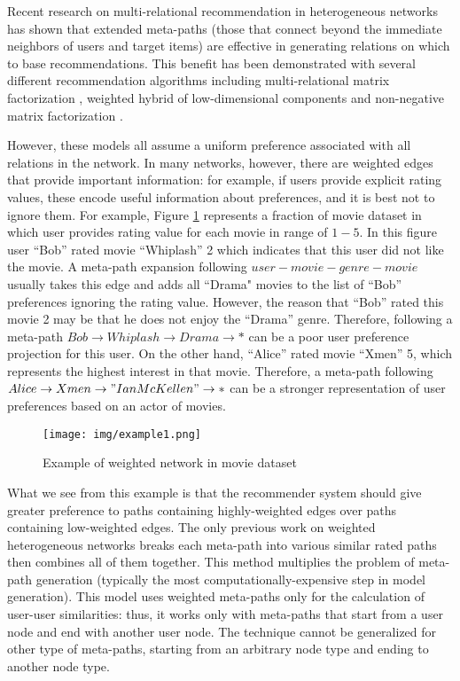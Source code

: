 \documentclass {acmart}
\begin{document}
Recent research on multi-relational recommendation in heterogeneous networks has shown that extended meta-paths (those that connect beyond the immediate neighbors of users and target items) are effective in generating relations on which to base recommendations. This benefit has been demonstrated with several different recommendation algorithms including  multi-relational matrix factorization \cite{DBLP:conf/recsys/VahedianBM15,DBLP:conf/flairs/VahedianBM16}, weighted hybrid of low-dimensional components \cite{DBLP:conf/um/BurkeVM14,DBLP:conf/recsys/BurkeV13,DBLP:conf/recsys/VahedianB14,DBLP:conf/recsys/Vahedian14} and non-negative matrix factorization \cite{yu2014personalized,Yu:2013:RHI:2507157.2507230}. 

However, these models all assume a uniform preference associated with all relations in the network. In many networks, however, there are weighted edges that provide important information: for example, if users provide explicit rating values, these encode useful information about preferences, and it is best not to ignore them. For example, Figure \ref{fig:wnet} represents a fraction of movie dataset in which user provides rating value for each movie in range of $1-5$. In this figure user ``Bob'' rated movie ``Whiplash'' 2 which indicates that this user did not like the movie. A meta-path expansion following $user-movie-genre-movie$ usually takes this edge and adds all ``Drama" movies to the list of ``Bob'' preferences ignoring the rating value. However, the reason that ``Bob'' rated this movie 2 may be that he does not enjoy the ``Drama'' genre. Therefore, following a meta-path $Bob \rightarrow Whiplash \rightarrow Drama \rightarrow *$ can be a poor user preference projection for this user. On the other hand, ``Alice'' rated movie ``Xmen'' 5, which represents the highest interest in that movie. Therefore, a meta-path following $Alice \rightarrow Xmen \rightarrow "Ian McKellen" \rightarrow * $ can be a stronger representation of user preferences based on an actor of movies.

\begin{figure}[tbh]
	\centering
	\texttt{[image: img/example1.png]}
	\caption{\label{fig:wnet} Example of weighted network in movie dataset}
\end{figure}

What we see from this example is that the recommender system should give greater preference to paths containing highly-weighted edges over paths containing low-weighted edges. The only previous work on weighted heterogeneous networks breaks each meta-path into various similar rated paths \cite{Shi:2015:SPB:2806416.2806528} then combines all of them together. This method multiplies the problem of meta-path generation (typically the most computationally-expensive step in model generation). This model uses weighted meta-paths only for the calculation of user-user similarities: thus, it works only with meta-paths that start from a user node and end with another user node. The technique cannot be generalized for other type of meta-paths, starting from an arbitrary node type and ending to another node type.
\end{document}
